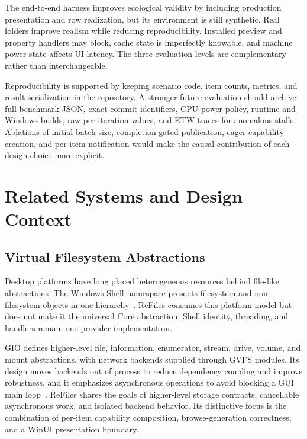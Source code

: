 \documentclass[10pt,a4paper,twoside]{article}
\begin{document}
The end-to-end harness improves ecological validity by including production presentation and row realization, but
its environment is still synthetic. Real folders improve realism while reducing reproducibility. Installed
preview and property handlers may block, cache state is imperfectly knowable, and machine power state affects UI
latency. The three evaluation levels are complementary rather than interchangeable.

Reproducibility is supported by keeping scenario code, item counts, metrics, and result serialization in the
repository. A stronger future evaluation should archive full benchmark JSON, exact commit identifiers, CPU power
policy, runtime and Windows builds, raw per-iteration values, and ETW traces for anomalous stalls. Ablations of
initial batch size, completion-gated publication, eager capability creation, and per-item notification would make
the causal contribution of each design choice more explicit.

\section{Related Systems and Design Context}
\label{section:related-work}

\subsection{Virtual Filesystem Abstractions}

Desktop platforms have long placed heterogeneous resources behind file-like abstractions. The Windows Shell
namespace presents filesystem and non-filesystem objects in one hierarchy~\cite{windows-shell-namespace}.
ReFiles consumes this platform model but does not make it the universal Core abstraction: Shell identity,
threading, and handlers remain one provider implementation.

GIO defines higher-level file, information, enumerator, stream, drive, volume, and mount abstractions, with
network backends supplied through GVFS modules. Its design moves backends out of process to reduce dependency
coupling and improve robustness, and it emphasizes asynchronous operations to avoid blocking a GUI main
loop~\cite{gio-overview}. ReFiles shares the goals of higher-level storage contracts, cancellable asynchronous
work, and isolated backend behavior. Its distinctive focus is the combination of per-item capability
composition, browse-generation correctness, and a WinUI presentation boundary.
\end{document}
